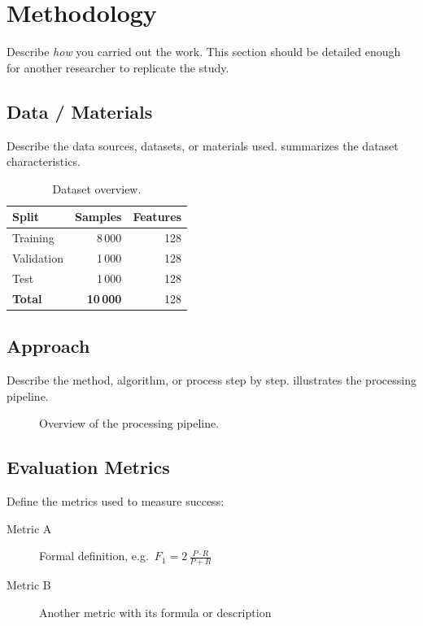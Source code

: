 \section{Methodology}
\label{sec:methodology}

Describe \emph{how} you carried out the work. This section should be detailed
enough for another researcher to replicate the study.

\subsection{Data / Materials}

Describe the data sources, datasets, or materials used.
 summarizes the dataset characteristics.

\begin{table}[h]
  \centering
  \caption{Dataset overview.}
  \label{tab:dataset}
  \begin{tabular}{lrr}
    \toprule
    Split      & Samples & Features \\
    \midrule
    Training   & 8\,000  & 128      \\
    Validation & 1\,000  & 128      \\
    Test       & 1\,000  & 128      \\
    \midrule
    \textbf{Total} & \textbf{10\,000} & 128 \\
    \bottomrule
  \end{tabular}
\end{table}

\subsection{Approach}

Describe the method, algorithm, or process step by step.
 illustrates the processing pipeline.

\begin{figure}[h]
  \centering
  \caption{Overview of the processing pipeline.}
  \label{fig:pipeline}
\end{figure}

\subsection{Evaluation Metrics}

Define the metrics used to measure success:

\begin{description}
  \item[Metric A] Formal definition, e.g.\ $F_1 = 2\,\frac{P \cdot R}{P + R}$
  \item[Metric B] Another metric with its formula or description
\end{description}

